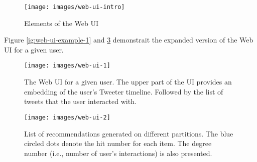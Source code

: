 \begin{figure}[!htb]
	\centering
	\texttt{[image: images/web-ui-intro]}
	\caption{Elements of the Web UI}
	\label{fig:web-ui-intro}
\end{figure}

Figure \ref{ig:web-ui-example-1} and \ref{fig:web-ui-example-2} demonstrait the expanded version of the Web UI for a given user.

\begin{figure}[!htb]
	\centering
	\texttt{[image: images/web-ui-1]}
	\caption{The Web UI for a given user. The upper part of the UI provides an embedding of the user's Tweeter timeline. Followed by the list of tweets that the user interacted with.}
	\label{fig:web-ui-example-1}
\end{figure}

\begin{figure}[!htb]
	\centering
	\texttt{[image: images/web-ui-2]}
	\caption{List of recommendations generated on different partitions. The blue circled dots denote the hit number for each item. The degree number (i.e., number of user's interactions) is also presented.}
	\label{fig:web-ui-example-2}
\end{figure}
